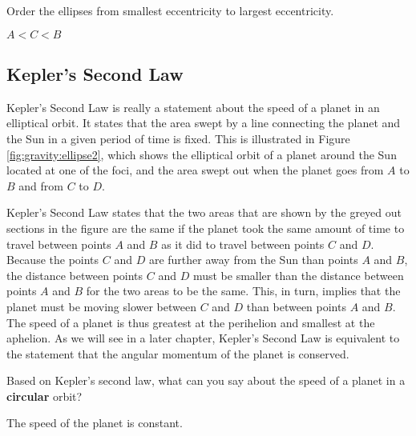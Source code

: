 \begin{checkpoint} Order the ellipses from smallest eccentricity to largest eccentricity.
\begin{answer}
$A<C<B$
\end{answer}
\end{checkpoint}

\subsection{Kepler's Second Law}
Kepler's Second Law is really a statement about the speed of a planet in an elliptical orbit. It states that the area swept by a line connecting the planet and the Sun in a given period of time is fixed. This is illustrated in Figure \ref{fig:gravity:ellipse2}, which shows the elliptical orbit of a planet around the Sun located at one of the foci, and the area swept out when the planet goes from $A$ to $B$ and from $C$ to $D$. 

Kepler's Second Law states that the two areas that are shown by the greyed out sections in the figure are the same if the planet took the same amount of time to travel between points $A$ and $B$ as it did to travel between points $C$ and $D$. Because the points $C$ and $D$ are further away from the Sun than points $A$ and $B$, the distance between points $C$ and $D$ must be smaller than the distance between points $A$ and $B$ for the two areas to be the same. This, in turn, implies that the planet must be moving slower between $C$ and $D$ than between points $A$ and $B$. The speed of a planet is thus greatest at the perihelion and smallest at the aphelion. As we will see in a later chapter, Kepler's Second Law is equivalent to the statement that the angular momentum of the planet is conserved.

\begin{checkpoint}
Based on Kepler's second law, what can you say about the speed of a planet in a \textbf{circular} orbit? 
\begin{answer}
The speed of the planet is constant.
\end{answer}
\end{checkpoint} 

